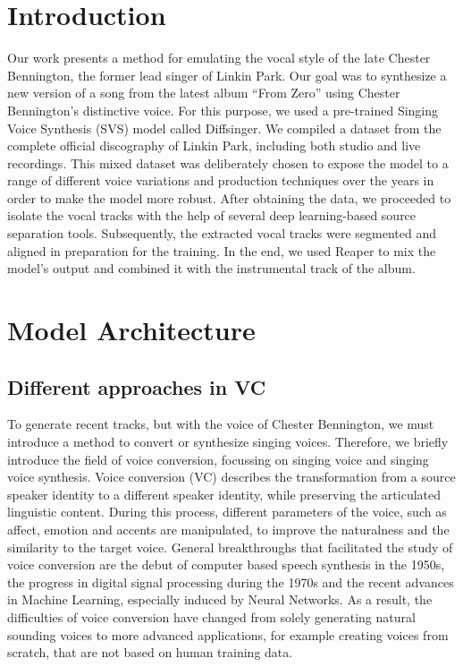 \documentclass[a4paper]{article}
\subtitle \\
\author{\StudNumeOne}
\begin{document}
	
	\section*{Introduction}
 
 	Our work presents a method for emulating the vocal style of the late Chester Bennington, the former lead singer of Linkin Park. Our goal was to synthesize a new version of a song from the latest album “From Zero” using Chester Bennington’s distinctive voice. For this purpose, we used a pre-trained Singing Voice Synthesis (SVS) model called Diffsinger.
We compiled a dataset from the complete official discography of Linkin Park, including both studio and live recordings. This mixed dataset was deliberately chosen to expose the model to a range of different voice variations and production techniques over the years in order to make the model more robust.
After obtaining the data, we proceeded to isolate the vocal tracks with the help of several deep learning-based source separation tools. Subsequently, the extracted vocal tracks were segmented and aligned in preparation for the training. In the end, we used Reaper to mix the model’s output and combined it with the instrumental track of the album.

	
	
	\section{Model Architecture}
	
	\subsection{Different approaches in VC}
	
	To generate recent tracks, but with the voice of Chester Bennington, we must introduce a method to convert or synthesize singing voices. Therefore, we briefly introduce the field of voice conversion, focussing on singing voice and singing voice synthesis. Voice conversion (VC) describes the transformation from a source speaker identity to a different speaker identity, while preserving the articulated linguistic content. During this process, different parameters of the voice, such as affect, emotion and accents are manipulated, to improve the naturalness and the similarity to the target voice. General breakthroughs that facilitated the study of voice conversion are the debut of computer based speech synthesis in the 1950s, the progress in digital signal processing during the 1970s and the recent advances in Machine Learning, especially induced by Neural Networks. \cite{Sisman2020} As a result, the difficulties of voice conversion have changed from solely generating natural sounding voices to more advanced applications, for example creating voices from scratch, that are not based on human training data. 
	
\end{document}
